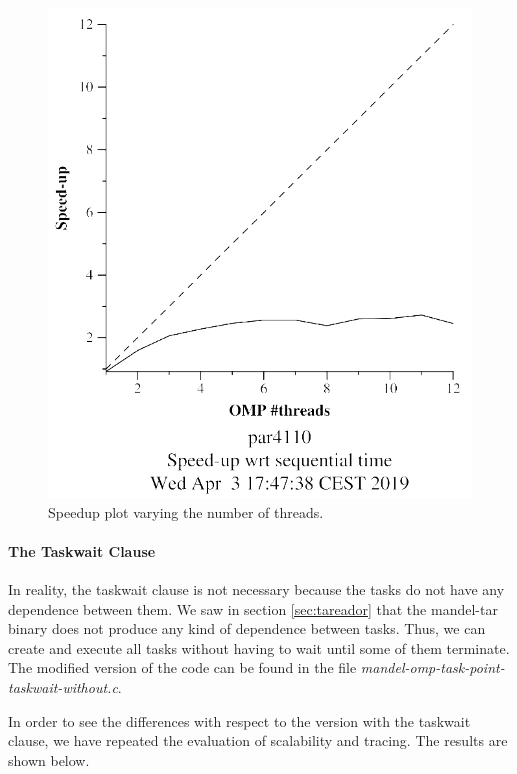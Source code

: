 \documentclass[12pt, a4paper]{article}
\begin{document}
\begin{figure}[H]
\begin{minipage}[b]{0.4\linewidth}
  \includegraphics[scale=0.5]{./mandel-omp-10000-strong-22-speedup}
  \caption{Speedup plot varying the number of threads.}
  \label{fig:mandel-omp-10000-strong-22-speedup}
\end{minipage}
\end{figure}

\paragraph{The Taskwait Clause}

\hfill

In reality, the taskwait clause is not necessary because the tasks do not have any dependence between them. We saw in section \ref{sec:tareador} that the mandel-tar binary does not produce any kind of dependence between tasks. Thus, we can create and execute all tasks without having to wait until some of them terminate. The modified version of the code can be found in the file \textit{mandel-omp-task-point-taskwait-without.c}.

In order to see the differences with respect to the version with the taskwait clause, we have repeated the evaluation of scalability and tracing. The results are shown below.
\end{document}

